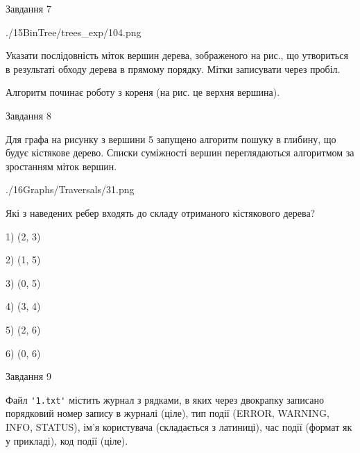 \documentclass[12pt, ukrainian]{article}
\def\code#1{\Verb!#1!}
\begin{document}
{\vspace{10mm}\par

\newpage
\begin{minipage}[t]{9.7cm}
               
{\begin{center}Завдання {7}\end{center}}
\vspace{-6mm}

\begin{center}
	{./15BinTree/trees_exp/104.png}
\end{center}
Указати послідовність міток вершин дерева, зображеного на рис., що утвориться в результаті обходу дерева в прямому порядку. Мітки записувати через пробіл.\par Алгоритм починає роботу з кореня (на рис. це верхня вершина).\par

\end{minipage}
\vline \hspace{8mm}
\begin{minipage}[t]{8.0cm}
               
{\begin{center}Завдання {8}\end{center}}
\vspace{-6mm}
Для графа на рисунку з вершини 5 запущено алгоритм пошуку в глибину, що будує кістякове дерево. Списки суміжності вершин переглядаються алгоритмом за зростанням міток вершин.\par
\begin{center}
	{./16Graphs/Traversals/31.png}
\end{center}
\par Які з наведених ребер входять до складу отриманого кістякового дерева?\par
1) (2, 3)\par
2) (1, 5)\par
3) (0, 5)\par
4) (3, 4)\par
5) (2, 6)\par
6) (0, 6)\par
{\vskip 15pt} \par

\end{minipage}

               
{\begin{center}Завдання {9}\end{center}}
\vspace{-6mm}
Файл \code{'1.txt'} містить журнал з рядками, в яких через двокрапку записано поряд\-ко\-вий номер запису в журналі (ціле), тип події (ERROR, WARNING, INFO, STATUS), ім'я користувача (складається з латиниці), час події (фор\-мат як у прикладі), код події (ціле).

}
\end{document}

